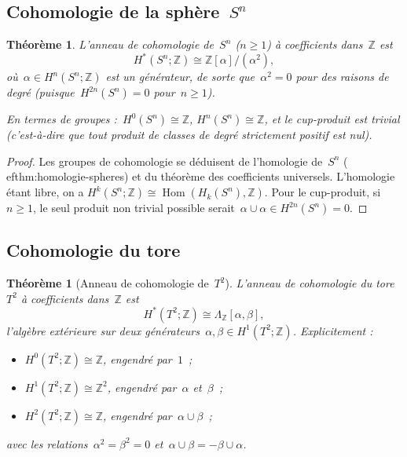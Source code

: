 \documentclass[12pt,a4paper,openany]{book}
\theoremstyle{definition}
\theoremstyle{plain}
\newtheorem{theoreme}[definition]{Théorème}
\theoremstyle{remark}
\newcommand{\Z}{\mathbb{Z}}
\DeclareMathOperator{\Hom}{Hom}
\begin{document}
\subsection{Cohomologie de la sphère~$S^n$}\label{subsec:cohomologie-sphere}

\begin{theoreme}\label{thm:cohomologie-sphere}
L'anneau de cohomologie de~$S^n$ ($n \geqslant 1$) à coefficients dans~$\Z$ est
\[
  H^*(S^n; \Z) \cong \Z[\alpha]/(\alpha^2),
\]
où~$\alpha \in H^n(S^n; \Z)$ est un générateur, de sorte que~$\alpha^2 = 0$ pour des
raisons de degré (puisque~$H^{2n}(S^n) = 0$ pour~$n \geqslant 1$).

En termes de groupes :~$H^0(S^n) \cong \Z$, $H^n(S^n) \cong \Z$, et le cup-produit
est trivial (c'est-à-dire que tout produit de classes de degré strictement positif est nul).
\end{theoreme}

\begin{proof}
Les groupes de cohomologie se déduisent de l'homologie de~$S^n$ (
ef{thm:homologie-spheres})
et du théorème des coefficients universels. L'homologie étant libre, on a
$H^k(S^n;\Z) \cong \Hom(H_k(S^n), \Z)$. Pour le cup-produit, si~$n \geqslant 1$, le seul
produit non trivial possible serait~$\alpha \cup \alpha \in H^{2n}(S^n) = 0$.
\end{proof}

\subsection{Cohomologie du tore}\label{subsec:cohomologie-tore}

\begin{theoreme}[Anneau de cohomologie de~$T^2$]\label{thm:cohomologie-tore}
L'anneau de cohomologie du tore~$T^2$ à coefficients dans~$\Z$ est
\[
  H^*(T^2; \Z) \cong \Lambda_\Z[\alpha, \beta],
\]
l'algèbre extérieure sur deux générateurs~$\alpha, \beta \in H^1(T^2;\Z)$.
Explicitement :
\begin{itemize}
  \item $H^0(T^2;\Z) \cong \Z$, engendré par~$1$~;
  \item $H^1(T^2;\Z) \cong \Z^2$, engendré par~$\alpha$ et~$\beta$~;
  \item $H^2(T^2;\Z) \cong \Z$, engendré par~$\alpha \cup \beta$~;
\end{itemize}
avec les relations~$\alpha^2 = \beta^2 = 0$ et~$\alpha \cup \beta = -\beta \cup \alpha$.
\end{theoreme}
\end{document}
